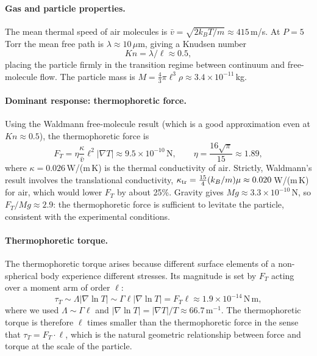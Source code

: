 \documentclass[11pt]{article}
\newcommand{\chg}[1]{\marginpar{\raggedright\footnotesize\textcolor{red!70!black}{\textsf{#1}}}}
\begin{document}
\paragraph{Gas and particle properties.} The mean thermal speed of air molecules is $\bar v=\sqrt{2k_BT/m}\approx415\,$m/s. At $P=5\,$Torr the mean free path is $\lambda\approx10\,\mu$m, giving a Knudsen number
\begin{equation}
  Kn=\lambda/\ell\approx0.5,
\end{equation}
placing the particle firmly in the transition regime between continuum and free-molecule flow. The particle mass is $M=\frac43\pi\ell^3\rho\approx3.4\times10^{-11}\,$kg.

\paragraph{Dominant response: thermophoretic force.} Using the Waldmann free-molecule result (which is a good approximation even at $Kn\approx0.5$), the thermophoretic force is
\begin{equation}
  F_T=\eta\frac{\kappa}{\bar v}\ell^2|\nabla T|\approx9.5\times10^{-10}\,\mathrm N,\qquad \eta=\frac{16\sqrt\pi}{15}\approx1.89,
\end{equation}
where $\kappa=0.026\,$W/(m\,K) is the thermal conductivity of air. Strictly, Waldmann's result involves the translational conductivity, $\kappa_{\rm tr}=\frac{15}{4}(k_B/m)\mu\approx0.020\,$W/(m\,K) for air, which would lower $F_T$ by about 25\%.\chg{C18} Gravity gives $Mg\approx3.3\times10^{-10}\,$N, so $F_T/Mg\approx2.9$: the thermophoretic force is sufficient to levitate the particle, consistent with the experimental conditions.

\paragraph{Thermophoretic torque.} The thermophoretic torque arises because different surface elements of a non-spherical body experience different stresses. Its magnitude is set by $F_T$ acting over a moment arm of order $\ell$:
\begin{equation}
  \tau_T\sim\Lambda|\nabla\ln T|\sim\Gamma\ell|\nabla\ln T|=F_T\ell\approx1.9\times10^{-14}\,\mathrm{N\,m},
\end{equation}
where we used $\Lambda\sim\Gamma\ell$ and $|\nabla\ln T|=|\nabla T|/T\approx66.7\,$m$^{-1}$. The thermophoretic torque is therefore $\ell$ times smaller than the thermophoretic force in the sense that $\tau_T=F_T\cdot\ell$, which is the natural geometric relationship between force and torque at the scale of the particle.
\end{document}
